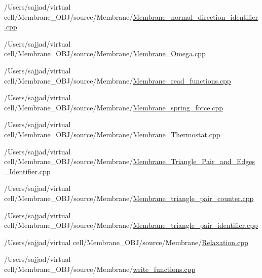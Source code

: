 \begin{DoxyCompactItemize}
/\+Users/sajjad/virtual cell/\+Membrane\+\_\+\+O\+B\+J/source/\+Membrane/\mbox{\hyperlink{Membrane__normal__direction__identifier_8cpp}{Membrane\+\_\+normal\+\_\+direction\+\_\+identifier.\+cpp}}\item 
/\+Users/sajjad/virtual cell/\+Membrane\+\_\+\+O\+B\+J/source/\+Membrane/\mbox{\hyperlink{Membrane__Omega_8cpp}{Membrane\+\_\+\+Omega.\+cpp}}\item 
/\+Users/sajjad/virtual cell/\+Membrane\+\_\+\+O\+B\+J/source/\+Membrane/\mbox{\hyperlink{Membrane__read__functions_8cpp}{Membrane\+\_\+read\+\_\+functions.\+cpp}}\item 
/\+Users/sajjad/virtual cell/\+Membrane\+\_\+\+O\+B\+J/source/\+Membrane/\mbox{\hyperlink{Membrane__spring__force_8cpp}{Membrane\+\_\+spring\+\_\+force.\+cpp}}\item 
/\+Users/sajjad/virtual cell/\+Membrane\+\_\+\+O\+B\+J/source/\+Membrane/\mbox{\hyperlink{Membrane__Thermostat_8cpp}{Membrane\+\_\+\+Thermostat.\+cpp}}\item 
/\+Users/sajjad/virtual cell/\+Membrane\+\_\+\+O\+B\+J/source/\+Membrane/\mbox{\hyperlink{Membrane__Triangle__Pair__and__Edges__Identifier_8cpp}{Membrane\+\_\+\+Triangle\+\_\+\+Pair\+\_\+and\+\_\+\+Edges\+\_\+\+Identifier.\+cpp}}\item 
/\+Users/sajjad/virtual cell/\+Membrane\+\_\+\+O\+B\+J/source/\+Membrane/\mbox{\hyperlink{Membrane__triangle__pair__counter_8cpp}{Membrane\+\_\+triangle\+\_\+pair\+\_\+counter.\+cpp}}\item 
/\+Users/sajjad/virtual cell/\+Membrane\+\_\+\+O\+B\+J/source/\+Membrane/\mbox{\hyperlink{Membrane__triangle__pair__identifier_8cpp}{Membrane\+\_\+triangle\+\_\+pair\+\_\+identifier.\+cpp}}\item 
/\+Users/sajjad/virtual cell/\+Membrane\+\_\+\+O\+B\+J/source/\+Membrane/\mbox{\hyperlink{Relaxation_8cpp}{Relaxation.\+cpp}}\item 
/\+Users/sajjad/virtual cell/\+Membrane\+\_\+\+O\+B\+J/source/\+Membrane/\mbox{\hyperlink{Membrane_2write__functions_8cpp}{write\+\_\+functions.\+cpp}}\end{DoxyCompactItemize}
